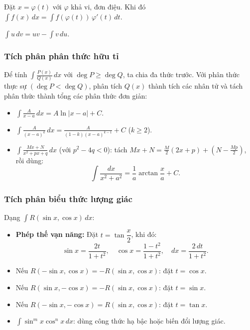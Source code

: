\documentclass[12pt,a4paper]{article}
\begin{document}
\begin{phuongphap}[title={Phương pháp đổi biến}]
  Đặt $x = \varphi(t)$ với $\varphi$ khả vi, đơn điệu. Khi đó $\displaystyle\int f(x)\,dx = \int f(\varphi(t))\,\varphi'(t)\,dt$.
\end{phuongphap}

\begin{phuongphap}[title={Tích phân từng phần}]
  $\displaystyle\int u\,dv = uv - \int v\,du$.
\end{phuongphap}

\subsubsection{Tích phân phân thức hữu tỉ}

\begin{phuongphap}
  Để tính $\displaystyle\int \frac{P(x)}{Q(x)}\,dx$ với $\deg P \ge \deg Q$, ta chia đa thức trước. Với phân thức thực sự $\left(\deg P < \deg Q\right)$, phân tích $Q(x)$ thành tích các nhân tử và tách phân thức thành tổng các phân thức đơn giản:
  \begin{itemize}
    \item $\displaystyle\int \frac{A}{x - a}\,dx = A\ln|x - a| + C$.
    \item $\displaystyle\int \frac{A}{(x - a)^k}\,dx = \frac{A}{(1-k)(x-a)^{k-1}} + C$ ($k \ge 2$).
    \item $\displaystyle\int \frac{Mx + N}{x^2 + px + q}\,dx$ (với $p^2 - 4q < 0$): tách $Mx + N = \frac{M}{2}(2x + p) + \left(N - \frac{Mp}{2}\right)$, rồi dùng:
      \[
        \int \frac{dx}{x^2 + a^2} = \frac{1}{a}\arctan\frac{x}{a} + C.
      \]
  \end{itemize}
\end{phuongphap}

\subsubsection{Tích phân biểu thức lượng giác}

\begin{phuongphap}
  Dạng $\displaystyle\int R(\sin x, \cos x)\,dx$:
  \begin{itemize}
    \item \textbf{Phép thế vạn năng:} Đặt $t = \tan\dfrac{x}{2}$, khi đó:
      \[
        \sin x = \frac{2t}{1+t^2}, \quad \cos x = \frac{1-t^2}{1+t^2}, \quad dx = \frac{2\,dt}{1+t^2}.
      \]
    \item Nếu $R(-\sin x, \cos x) = -R(\sin x, \cos x)$: đặt $t = \cos x$.
    \item Nếu $R(\sin x, -\cos x) = -R(\sin x, \cos x)$: đặt $t = \sin x$.
    \item Nếu $R(-\sin x, -\cos x) = R(\sin x, \cos x)$: đặt $t = \tan x$.
    \item $\displaystyle\int \sin^m x \cos^n x\,dx$: dùng công thức hạ bậc hoặc biến đổi lượng giác.
  \end{itemize}
\end{phuongphap}
\end{document}

